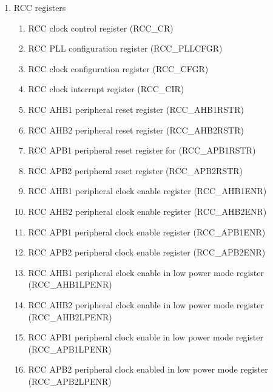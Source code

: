 \documentclass{article}
\begin{document}
\begin{enumerate}
\begin{enumerate}
\begin{enumerate}
            \item Clock security system (CSS) 
            \item RTC/AWU clock 
            \item Watchdog clock 
            \item Clock-out capability 
            \item Internal/external clock measurement using TIM5/TIM11 
        \end{enumerate}
        \item RCC registers 
        \begin{enumerate}
            \item RCC clock control register (RCC\_CR) 
            \item RCC PLL configuration register (RCC\_PLLCFGR) 
            \item RCC clock configuration register (RCC\_CFGR) 
            \item RCC clock interrupt register (RCC\_CIR) 
            \item RCC AHB1 peripheral reset register (RCC\_AHB1RSTR) 
            \item RCC AHB2 peripheral reset register (RCC\_AHB2RSTR) 
            \item RCC APB1 peripheral reset register for (RCC\_APB1RSTR) 
            \item RCC APB2 peripheral reset register (RCC\_APB2RSTR) 
            \item RCC AHB1 peripheral clock enable register (RCC\_AHB1ENR) 
            \item RCC AHB2 peripheral clock enable register (RCC\_AHB2ENR) 
            \item RCC APB1 peripheral clock enable register (RCC\_APB1ENR) 
            \item RCC APB2 peripheral clock enable register (RCC\_APB2ENR) 
            \item RCC AHB1 peripheral clock enable in low power mode register (RCC\_AHB1LPENR) 
            \item RCC AHB2 peripheral clock enable in low power mode register (RCC\_AHB2LPENR) 
            \item RCC APB1 peripheral clock enable in low power mode register (RCC\_APB1LPENR) 
            \item RCC APB2 peripheral clock enabled in low power mode register (RCC\_APB2LPENR) 

\end{enumerate}
\end{enumerate}
\end{enumerate}
\end{document}
